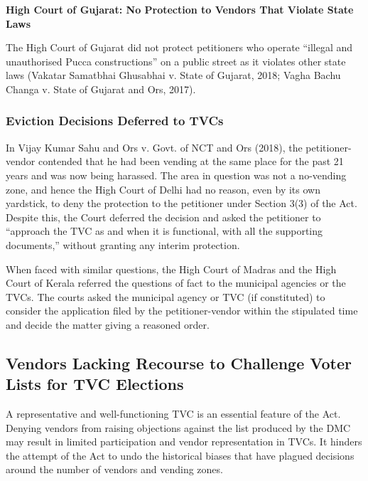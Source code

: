 \documentclass[a4paper, 12pt, twoside]{article}
\begin{document}
\textbf{High Court of Gujarat: No Protection to Vendors That Violate State Laws}

The High Court of Gujarat did not protect petitioners who operate “illegal and unauthorised Pucca constructions” on a public street as it violates other state laws (Vakatar Samatbhai Ghusabhai v. State of Gujarat, 2018; Vagha Bachu Changa v. State of Gujarat and Ors, 2017).

\subsubsection*{Eviction Decisions Deferred to TVCs}


In Vijay Kumar Sahu and Ors v. Govt. of NCT and Ors (2018), the petitioner-vendor contended that he had been vending at the same place for the past 21 years and was now being harassed. The area in question was not a no-vending zone, and hence the High Court of Delhi had no reason, even by its own yardstick, to deny the protection to the petitioner under Section 3(3) of the Act. Despite this, the Court deferred the decision and asked the petitioner to “approach the TVC as and when it is functional, with all the supporting documents,” without granting any interim protection.


When faced with similar questions, the High Court of Madras and the High Court of Kerala referred the questions of fact to the municipal agencies or the TVCs. The courts asked the municipal agency or TVC (if constituted) to consider the application filed by the petitioner-vendor within the stipulated time and decide the matter giving a reasoned order.

\subsection*{Vendors Lacking Recourse to Challenge Voter Lists for TVC Elections}



A representative and well-functioning TVC is an essential feature of the Act. Denying vendors from raising objections against the list produced by the DMC may result in limited participation and vendor representation in TVCs. It hinders the attempt of the Act to undo the historical biases that have plagued decisions around the number of vendors and vending zones.


\end{document}
